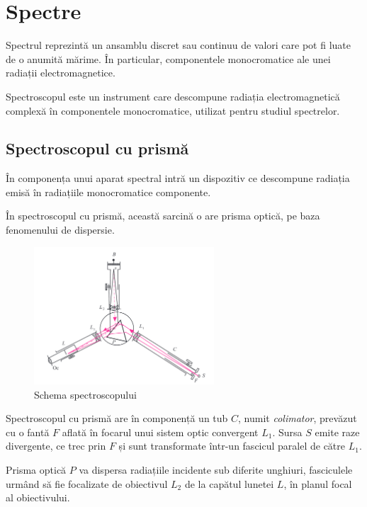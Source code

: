 \section{Spectre}

Spectrul reprezintă un ansamblu discret sau continuu de valori care pot fi
luate de o anumită mărime. În particular, componentele monocromatice ale unei
radiații electromagnetice.

Spectroscopul este un instrument care descompune radiația electromagnetică
complexă în componentele monocromatice, utilizat pentru studiul spectrelor.

\subsection{Spectroscopul cu prismă}

În componența unui aparat spectral intră un dispozitiv ce descompune radiația
emisă în radiațiile monocromatice componente.

În spectroscopul cu prismă, această sarcină o are prisma optică, pe baza
fenomenului de dispersie.

\begin{figure}
    \includegraphics[width=0.6\textwidth]{fig/spectroscop}
    \caption{Schema spectroscopului}
\end{figure}

Spectroscopul cu prismă are în componență un tub $C$, numit \emph{colimator},
prevăzut cu o fantă $F$ aflată în focarul unui sistem optic convergent $L_1$.
Sursa $S$ emite raze divergente, ce trec prin $F$ și sunt transformate într-un
fascicul paralel de către $L_1$.

Prisma optică $P$ va dispersa radiațiile incidente sub diferite unghiuri,
fasciculele urmând să fie focalizate de obiectivul $L_2$ de la capătul lunetei
$L$, în planul focal al obiectivului.

\clearpage

